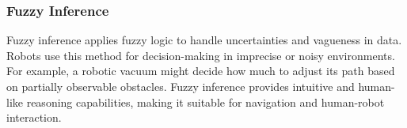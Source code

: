     \subsubsection{Fuzzy Inference}
    Fuzzy inference applies fuzzy logic to handle uncertainties and vagueness in data. Robots use this method for decision-making in imprecise or noisy environments. For example, a robotic vacuum might decide how much to adjust its path based on partially observable obstacles. Fuzzy inference provides intuitive and human-like reasoning capabilities, making it suitable for navigation and human-robot interaction. \cite{pfeifer-2007-embodied-intelligence}